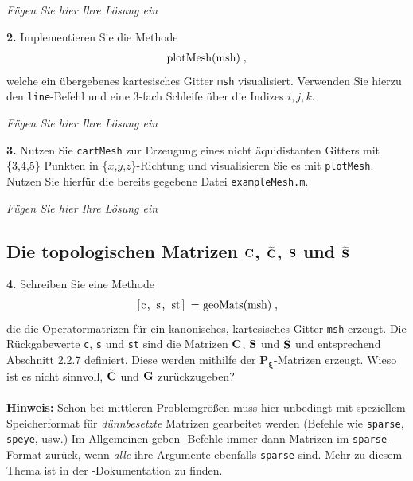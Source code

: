 \documentclass[Protokollheft.tex]{subfiles}
\begin{document}
\emph{Fügen Sie hier Ihre Lösung ein}

        \begin{framed}
	\noindent \textbf{2.} Implementieren Sie die Methode
                    \begin{align}
                        \lstinline{plotMesh(msh)} \; ,
                    \end{align}
                    welche ein übergebenes kartesisches Gitter \lstinline{msh} visualisiert. Verwenden
                    Sie hierzu den \lstinline{line}-Befehl und eine 3-fach Schleife über die Indizes $i,j,k$.\label{exer:plotMesh}
\end{framed}

\emph{Fügen Sie hier Ihre Lösung ein}

        \begin{framed}
	\noindent \textbf{3.} Nutzen Sie \lstinline{cartMesh} zur Erzeugung eines nicht äquidistanten Gitters mit \{3,4,5\} Punkten in \{$x$,$y$,$z$\}-Richtung und visualisieren Sie es mit \lstinline{plotMesh}. Nutzen Sie hierfür die bereits gegebene Datei \lstinline{exampleMesh.m}.\label{exer:createVisualizeMesh}
\end{framed}

\emph{Fügen Sie hier Ihre Lösung ein}

%
    {\subsection{Die topologischen Matrizen $\mathbf{C}$, $\widetilde{\mathbf{C}}$, $\mathbf{S}$ und $\widetilde{\mathbf{S}}$}}

        \begin{framed}
	\noindent \textbf{4.} Schreiben Sie eine Methode
                    \begin{align}
                        \lstinline{[c, s, st] = geoMats(msh)} \; ,
                    \end{align}
                    die die Operatormatrizen für ein kanonisches, kartesisches
                    Gitter \lstinline{msh} erzeugt. Die Rückgabewerte
                    \lstinline{c}, \lstinline{s} und \lstinline{st}
                    sind die Matrizen $\mathbf{C}$, $\mathbf{S}$ und $\widetilde{\mathbf{S}}$
                    und entsprechend Abschnitt 2.2.7 definiert. Diese werden mithilfe der
${\mathbf{P_\xi}}$-Matrizen erzeugt.
                    Wieso ist es nicht sinnvoll, $\widetilde{\mathbf{C}}$ und $\mathbf{G}$ zurückzugeben?\\
                    \ \\
                    {\textbf{Hinweis:}} Schon bei mittleren Problemgrößen muss hier
                    unbedingt mit  speziellem Speicherformat für
                    \emph{dünnbesetzte} Matrizen gearbeitet werden (Befehle wie
                    \lstinline{sparse}, \lstinline{speye}, usw.) Im Allgemeinen geben
                    \matlab-Befehle immer dann Matrizen im \lstinline{sparse}-Format
                    zurück, wenn \emph{alle} ihre Argumente ebenfalls \lstinline{sparse}
                    sind. Mehr zu diesem Thema ist in der \matlab-Dokumentation zu finden.\label{exer:geoMats}
\end{framed}
\end{document}
